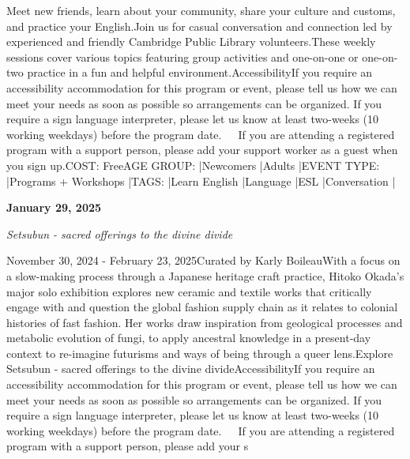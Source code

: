 \documentclass[letterpaper, 10pt]{article}
\newcommand{\headline}[1]{\textbf{\Large #1}\vspace{0.5em}}
\newcommand{\subtitle}[1]{\textit{\large #1}\vspace{0.5em}}
\newcommand{\articlecontent}[1]{\small #1\vspace{1em}}
\begin{document}
\begin{multicols}{2}
{
\vspace{10px}

Meet new friends, learn about your community, share your culture and customs, and practice your English.Join us for casual conversation and connection led by experienced and friendly Cambridge Public Library volunteers.These weekly sessions cover various topics featuring group activities and one-on-one or one-on-two practice in a fun and helpful environment.AccessibilityIf you require an accessibility accommodation for this program or event, please tell us how we can meet your needs as soon as possible so arrangements can be organized. If you require a sign language interpreter, please let us know at least two-weeks (10 working weekdays) before the program date.   If you are attending a registered program with a support person, please add your support worker as a guest when you sign up.COST: FreeAGE GROUP: |Newcomers |Adults |EVENT TYPE: |Programs + Workshops |TAGS: |Learn English |Language |ESL |Conversation |
}
\vspace{10px}

\headline{January 29, 2025}

\subtitle{Setsubun - sacred offerings to the divine divide}

\articlecontent{

\qrcode[height=1.5cm]{https://ideaexchange.libnet.info/event/11297387}
\vspace{10px}

November 30, 2024 - February 23, 2025Curated by Karly BoileauWith a focus on a slow-making process through a Japanese heritage craft practice, Hitoko Okada’s major solo exhibition explores new ceramic and textile works that critically engage with and question the global fashion supply chain as it relates to colonial histories of fast fashion. Her works draw inspiration from geological processes and metabolic evolution of fungi, to apply ancestral knowledge in a present-day context to re-imagine futurisms and ways of being through a queer lens.Explore Setsubun - sacred offerings to the divine divideAccessibilityIf you require an accessibility accommodation for this program or event, please tell us how we can meet your needs as soon as possible so arrangements can be organized. If you require a sign language interpreter, please let us know at least two-weeks (10 working weekdays) before the program date.   If you are attending a registered program with a support person, please add your s
}
\vspace{10px}


\end{multicols}
\end{document}
